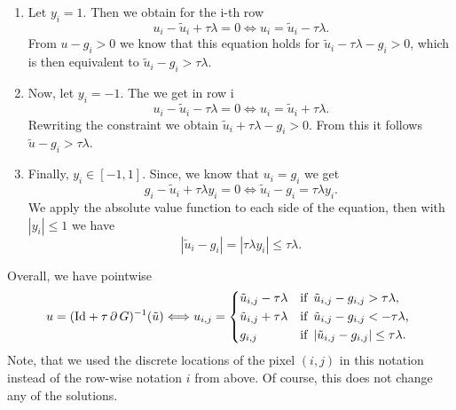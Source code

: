             \begin{enumerate}
                \item Let $y_{i} = 1$. Then we obtain for the i-th row
                    $$
                        u_{i} - \tilde{u}_{i} + \tau\lambda = 0 \Longleftrightarrow u_{i} = \tilde{u}_{i} - \tau\lambda.
                    $$
                From $u - g_{i} > 0$ we know that this equation holds for $\tilde{u}_{i} - \tau\lambda - g_{i} > 0$, which is then equivalent to $\tilde{u}_{i} - g_{i} > \tau\lambda$.
                \item Now, let $y_{i} = -1$. The we get in row i
                    $$
                        u_{i} - \tilde{u}_{i} - \tau\lambda = 0 \Longleftrightarrow u_{i} = \tilde{u}_{i} + \tau\lambda.
                    $$
                Rewriting the constraint we obtain $\tilde{u}_{i} + \tau\lambda - g_{i} > 0$. From this it follows $\tilde{u} - g_{i} > \tau\lambda$.
                \item Finally, $y_{i} \in [-1, 1]$. Since, we know that $u_{i} = g_{i}$ we get
                    $$
                        g_{i} - \tilde{u}_{i} + \tau\lambda y_{i} = 0 \Longleftrightarrow \tilde{u}_{i} - g_{i} = \tau\lambda y_{i}.
                    $$
                We apply the absolute value function to each side of the equation, then with $|y_{i}| \le 1$ we have
                    $$
                        |\tilde{u}_{i} - g_{i}| = |\tau\lambda y_{i}| \le \tau\lambda.
                    $$
            \end{enumerate}
        Overall, we have pointwise
            \begin{equation}
                u = (\textnormal{Id} + \tau\,\partial\,G)^{-1}(\tilde{u}) \Longleftrightarrow u_{i, j} = 
                    \begin{dcases*}
                        \tilde{u}_{i,j} - \tau\lambda & \textnormal{if\, $\tilde{u}_{i,j} - g_{i,j} > \tau\lambda$,} \\
                        \tilde{u}_{i,j} + \tau\lambda & \textnormal{if\, $\tilde{u}_{i,j} - g_{i,j} < - \tau\lambda$,} \\
                        g_{i, j} & \textnormal{if\, $|\tilde{u}_{i,j} - g_{i,j}| \le \tau\lambda$}.
                    \end{dcases*}
            \label{eq:prox_g_tvl1}
            \end{equation}
        Note, that we used the discrete locations of the pixel $(i, j)$ in this notation instead of the row-wise notation $i$ from above. Of course, this does not change any of the solutions.


